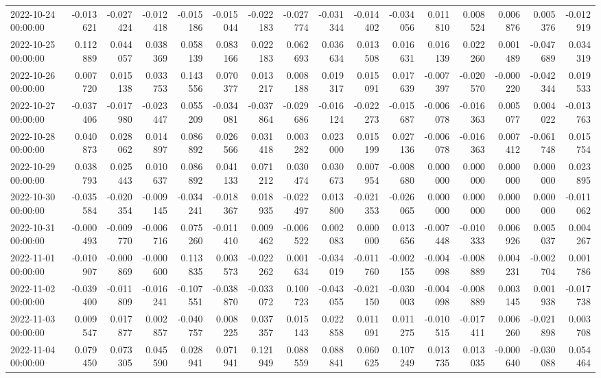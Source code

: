 \begin{tabular}{lrrrrrrrrrrrrrrr}
2022-10-24 00:00:00 & -0.013621 & -0.027424 & -0.012418 & -0.015186 & -0.015044 & -0.022183 & -0.027774 & -0.031344 & -0.014402 & -0.034056 & 0.011810 & 0.008524 & 0.006876 & 0.005376 & -0.012919 \\
2022-10-25 00:00:00 & 0.112889 & 0.044057 & 0.038369 & 0.058139 & 0.083166 & 0.022183 & 0.062693 & 0.036634 & 0.013508 & 0.016631 & 0.016139 & 0.022260 & 0.001489 & -0.047689 & 0.034319 \\
2022-10-26 00:00:00 & 0.007720 & 0.015138 & 0.033753 & 0.143556 & 0.070377 & 0.013217 & 0.008188 & 0.019317 & 0.015091 & 0.017639 & -0.007397 & -0.020570 & -0.000220 & -0.042344 & 0.019533 \\
2022-10-27 00:00:00 & -0.037406 & -0.017980 & -0.023447 & 0.055209 & -0.034081 & -0.037864 & -0.029686 & -0.016124 & -0.022273 & -0.015687 & -0.006078 & -0.016363 & 0.005077 & 0.004022 & -0.013763 \\
2022-10-28 00:00:00 & 0.040873 & 0.028062 & 0.014897 & 0.086892 & 0.026566 & 0.031418 & 0.003282 & 0.023000 & 0.015199 & 0.027136 & -0.006078 & -0.016363 & 0.007412 & -0.061748 & 0.015754 \\
2022-10-29 00:00:00 & 0.038793 & 0.025443 & 0.010637 & 0.086892 & 0.041133 & 0.071212 & 0.030474 & 0.030673 & 0.007954 & -0.008680 & 0.000000 & 0.000000 & 0.000000 & 0.000000 & 0.023895 \\
2022-10-30 00:00:00 & -0.035584 & -0.020354 & -0.009145 & -0.034241 & -0.018367 & 0.018935 & -0.022497 & 0.013800 & -0.021353 & -0.026065 & 0.000000 & 0.000000 & 0.000000 & 0.000000 & -0.011062 \\
2022-10-31 00:00:00 & -0.000493 & -0.009770 & -0.006716 & 0.075260 & -0.011410 & 0.009462 & -0.006522 & 0.002083 & 0.000000 & 0.013656 & -0.007448 & -0.010333 & 0.006926 & 0.005037 & 0.004267 \\
2022-11-01 00:00:00 & -0.010907 & -0.000869 & -0.000600 & 0.113835 & 0.003573 & -0.022262 & 0.001634 & -0.034019 & -0.011760 & -0.002155 & -0.004098 & -0.008889 & 0.004231 & -0.002704 & 0.001786 \\
2022-11-02 00:00:00 & -0.039400 & -0.011809 & -0.016241 & -0.107551 & -0.038870 & -0.033072 & 0.100723 & -0.043055 & -0.021150 & -0.030003 & -0.004098 & -0.008889 & 0.003145 & 0.001938 & -0.017738 \\
2022-11-03 00:00:00 & 0.009547 & 0.017877 & 0.002857 & -0.040757 & 0.008225 & 0.037357 & 0.015143 & 0.022858 & 0.011091 & 0.011275 & -0.010515 & -0.017411 & 0.006260 & -0.021898 & 0.003708 \\
2022-11-04 00:00:00 & 0.079450 & 0.073305 & 0.045590 & 0.028941 & 0.071941 & 0.121949 & 0.088559 & 0.088841 & 0.060625 & 0.107249 & 0.013735 & 0.013035 & -0.000640 & -0.030088 & 0.054464 \\

\end{tabular}
